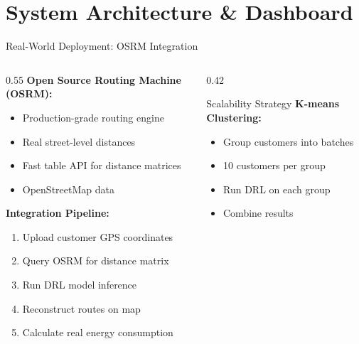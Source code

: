 \documentclass[aspectratio=169,11pt]{beamer}
\begin{document}
\section{System Architecture \& Dashboard}



\begin{frame}{Real-World Deployment: OSRM Integration}
    \begin{columns}[T]
        \begin{column}{0.55\textwidth}
            \textbf{Open Source Routing Machine (OSRM):}
            \begin{itemize}
                \item Production-grade routing engine
                \item Real street-level distances
                \item Fast table API for distance matrices
                \item OpenStreetMap data
            \end{itemize}
            
            \vspace{0.3cm}
            \textbf{Integration Pipeline:}
            \begin{enumerate}
                \item Upload customer GPS coordinates
                \item Query OSRM for distance matrix
                \item Run DRL model inference
                \item Reconstruct routes on map
                \item Calculate real energy consumption
            \end{enumerate}
        \end{column}
        \begin{column}{0.42\textwidth}
            \begin{block}{Scalability Strategy}
                \textbf{K-means Clustering:}
                \begin{itemize}
                    \item Group customers into batches
                    \item 10 customers per group
                    \item Run DRL on each group
                    \item Combine results
                \end{itemize}
            \end{block}
            

\end{column}
\end{columns}
\end{frame}
\end{document}

